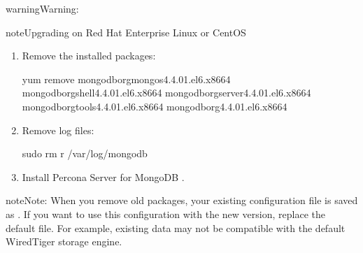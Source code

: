 \documentclass[letterpaper,10pt,english]{sphinxmanual}
\begin{document}
\begin{sphinxadmonition}{warning}{Warning:}
\begin{sphinxadmonition}{note}{Upgrading on Red Hat Enterprise Linux or CentOS}
\begin{enumerate}
\begin{sphinxadmonition}{note}{Output}

\begin{sphinxVerbatim}[commandchars=\\\{\}]
mongodb\PYGZhy{}org\PYGZhy{}mongos\PYGZhy{}4.4.0\PYGZhy{}1.el6.x86\PYGZus{}64
mongodb\PYGZhy{}org\PYGZhy{}shell\PYGZhy{}4.4.0\PYGZhy{}1.el6.x86\PYGZus{}64
mongodb\PYGZhy{}org\PYGZhy{}server\PYGZhy{}4.4.0\PYGZhy{}1.el6.x86\PYGZus{}64
mongodb\PYGZhy{}org\PYGZhy{}tools\PYGZhy{}4.4.0\PYGZhy{}1.el6.x86\PYGZus{}64
mongodb\PYGZhy{}org\PYGZhy{}4.4.0\PYGZhy{}1.el6.x86\PYGZus{}64
\end{sphinxVerbatim}
\end{sphinxadmonition}

\item {} 
\sphinxAtStartPar
Remove the installed packages:

\begin{sphinxVerbatim}[commandchars=\\\{\}]
\PYGZdl{} yum remove 
mongodb\PYGZhy{}org\PYGZhy{}mongos\PYGZhy{}4.4.0\PYGZhy{}1.el6.x86\PYGZus{}64 
mongodb\PYGZhy{}org\PYGZhy{}shell\PYGZhy{}4.4.0\PYGZhy{}1.el6.x86\PYGZus{}64 
mongodb\PYGZhy{}org\PYGZhy{}server\PYGZhy{}4.4.0\PYGZhy{}1.el6.x86\PYGZus{}64 
mongodb\PYGZhy{}org\PYGZhy{}tools\PYGZhy{}4.4.0\PYGZhy{}1.el6.x86\PYGZus{}64 
mongodb\PYGZhy{}org\PYGZhy{}4.4.0\PYGZhy{}1.el6.x86\PYGZus{}64
\end{sphinxVerbatim}

\item {} 
\sphinxAtStartPar
Remove log files:

\begin{sphinxVerbatim}[commandchars=\\\{\}]
\PYGZdl{} sudo rm \PYGZhy{}r /var/log/mongodb
\end{sphinxVerbatim}

\item {} 
\sphinxAtStartPar
Install Percona Server for MongoDB {\hyperref[\detokenize{install/yum:yum}]{}}.

\end{enumerate}

\begin{sphinxadmonition}{note}{Note:}
\sphinxAtStartPar
When you remove old packages, your existing configuration file is saved as
.  If you want to use this configuration with
the new version, replace the default  file.  For
example, existing data may not be compatible with the default WiredTiger
storage engine.
\end{sphinxadmonition}


\end{sphinxadmonition}
\end{sphinxadmonition}
\end{document}
